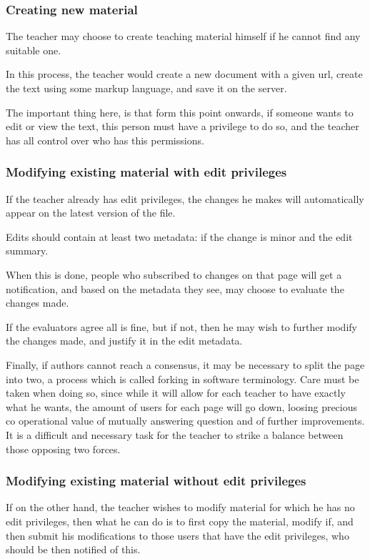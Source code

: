 \documentclass[12pt]{article}
\begin{document}
\subsubsection{Creating new material}

The teacher may choose to create teaching material himself if he cannot find any suitable one.

In this process, the teacher would create a new document with a given url, create the text using some markup language, and save it on the server.

The important thing here, is that form this point onwards, if someone wants to edit or view the text, this person must have a privilege to do so, and the teacher has all control over who has this permissions.

\subsubsection{Modifying existing material with edit privileges}

If the teacher already has edit privileges, the changes he makes will automatically appear on the latest version of the file.

Edits should contain at least two metadata: if the change is minor and the edit summary.

When this is done, people who subscribed to changes on that page will get a notification, and based on the metadata they see, may choose to evaluate the changes made.

If the evaluators agree all is fine, but if not, then he may wish to further modify the changes made, and justify it in the edit metadata.

Finally, if authors cannot reach a consensus, it may be necessary to split the page into two, a process which is called forking in software terminology. Care must be taken when doing so, since while it will allow for each teacher to have exactly what he wants, the amount of users for each page will go down, loosing precious co operational value of mutually answering question and of further improvements. It is a difficult and necessary task for the teacher to strike a balance between those opposing two forces.

\subsubsection{Modifying existing material without edit privileges}

If on the other hand, the teacher wishes to modify material for which he has no edit privileges, then what he can do is to first copy the material, modify if, and then submit his modifications to those users that have the edit privileges, who should be then notified of this.
\end{document}
